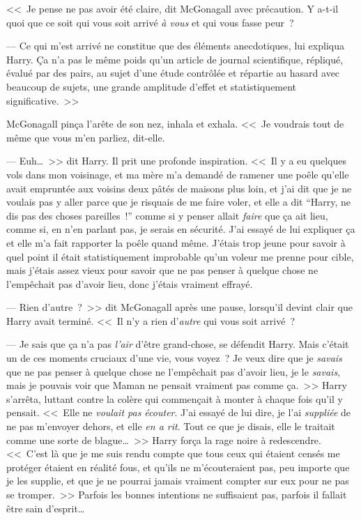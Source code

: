 <<~Je pense ne pas avoir été claire, dit McGonagall avec précaution. Y a-t-il quoi que ce soit qui vous soit arrivé \emph{à vous} et qui vous fasse peur~?

--- Ce qui m'est arrivé ne constitue que des éléments anecdotiques, lui expliqua Harry. Ça n'a pas le même poids qu'un article de journal scientifique, répliqué, évalué par des pairs, au sujet d'une étude contrôlée et répartie au hasard avec beaucoup de sujets, une grande amplitude d'effet et statistiquement significative.~>>

McGonagall pinça l'arête de son nez, inhala et exhala.
<<~Je voudrais tout de même que vous m'en parliez, dit-elle.

--- Euh…~>> dit Harry. Il prit une profonde inspiration. <<~Il y a eu quelques vols dans mon voisinage, et ma mère m'a demandé de ramener une poêle qu'elle avait empruntée aux voisins deux pâtés de maisons plus loin, et j'ai dit que je ne voulais pas y aller parce que je risquais de me faire voler, et elle a dit “Harry, ne dis pas des choses pareilles~!” comme si y penser allait \emph{faire} que ça ait lieu, comme si, en n'en parlant pas, je serais en sécurité. J'ai essayé de lui expliquer ça et elle m'a fait rapporter la poêle quand même. J'étais trop jeune pour savoir à quel point il était statistiquement improbable qu'un voleur me prenne pour cible, mais j'étais assez vieux pour savoir que ne pas penser à quelque chose ne l'empêchait pas d'avoir lieu, donc j'étais vraiment effrayé.

--- Rien d'autre~?~>> dit McGonagall après une pause, lorsqu'il devint clair que Harry avait terminé. <<~Il n'y a rien d'\emph{autre} qui vous soit arrivé~?

--- Je sais que ça n'a pas \emph{l'air} d'être grand-chose, se défendit Harry. Mais c'était un de ces moments cruciaux d'une vie, vous voyez~? Je veux dire que je \emph{savais} que ne pas penser à quelque chose ne l'empêchait pas d'avoir lieu, je le \emph{savais}, mais je pouvais voir que Maman ne pensait vraiment pas comme ça.~>> Harry s'arrêta, luttant contre la colère qui commençait à monter à chaque fois qu'il y pensait. <<~Elle ne \emph{voulait pas écouter}. J'ai essayé de lui dire, je l'ai \emph{suppliée} de ne pas m'envoyer dehors, et elle \emph{en a rit}. Tout ce que je disais, elle le traitait comme une sorte de blague…~>> Harry força la rage noire à redescendre. <<~C'est là que je me suis rendu compte que tous ceux qui étaient censés me protéger étaient en réalité fous, et qu'ils ne m'écouteraient pas, peu importe que je les supplie, et que je ne pourrai jamais vraiment compter sur eux pour ne pas se tromper.~>> Parfois les bonnes intentions ne suffisaient pas, parfois il fallait être sain d'esprit…

